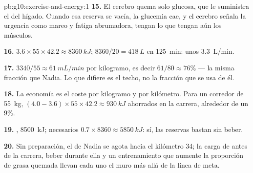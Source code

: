 \begin{solution}{pb:g10:exercise-and-energy:1}
\textbf{15.} El cerebro quema solo glucosa, que le suministra el
 del hígado. Cuando esa reserva se vacía, la glucemia cae, y
el cerebro señala la urgencia como mareo y fatiga abrumadora, tengan lo
que tengan aún los músculos.

\textbf{16.} $3.6 \times 55 \times 42.2 \approx \qty{8360}{kJ}$;
$8360/20 = \qty{418}{L}$ en \qty{125}{min}: unos \qty{3.3}{L/min}.

\textbf{17.} $3340/55 \approx \qty{61}{mL/min}$ por kilogramo, es decir
$61/80 \approx 76\%$ --- la misma fracción que Nadia. Lo que difiere es
el techo, no la fracción que se usa de él.

\textbf{18.} La economía es el coste por kilogramo y por kilómetro.
Para un corredor de \qty{55}{kg}, $(4.0 - 3.6) \times 55 \times 42.2 \approx
\qty{930}{kJ}$ ahorrados en la carrera, alrededor de un 9\%.

\textbf{19.} , \qty{8500}{kJ};  necesarios $0.7 \times
8360 \approx \qty{5850}{kJ}$: sí, las reservas bastan sin beber.

\textbf{20.} Sin preparación, el  de Nadia se agota hacia el
kilómetro 34; la carga de  antes de la carrera, beber 
durante ella y un entrenamiento que aumente la proporción de grasa
quemada llevan cada uno el muro más allá de la línea de meta.
\end{solution}
